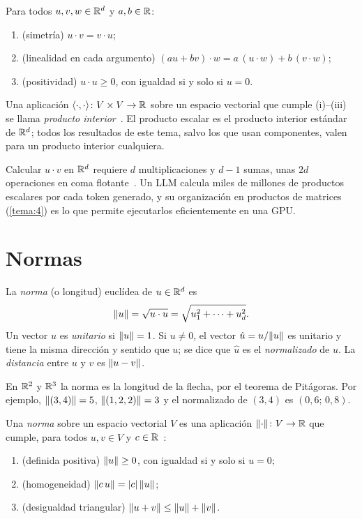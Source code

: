 \begin{proposicion}\label{prop:escalar}
Para todos $u,v,w\in\mathbb{R}^{d}$ y $a,b\in\mathbb{R}$:
\begin{enumerate}
  \item (simetría) $u\cdot v=v\cdot u$;
  \item (linealidad en cada argumento) $(au+bv)\cdot w=a\,(u\cdot w)+b\,(v\cdot w)$;
  \item (positividad) $u\cdot u\ge 0$, con igualdad si y solo si $u=0$.
\end{enumerate}
\end{proposicion}

Una aplicación $\langle \cdot,\cdot\rangle\colon V\times V\to\mathbb{R}$ sobre un espacio vectorial que cumple (i)--(iii) se llama \emph{producto interior}~\cite[§3.2]{mml}. El producto escalar es el producto interior estándar de $\mathbb{R}^{d}$; todos los resultados de este tema, salvo los que usan componentes, valen para un producto interior cualquiera.

\begin{observacion}[Coste]
Calcular $u\cdot v$ en $\mathbb{R}^{d}$ requiere $d$ multiplicaciones y $d-1$ sumas, unas $2d$ operaciones en coma flotante~\cite[§1.5]{vmls}. Un LLM calcula miles de millones de productos escalares por cada token generado, y su organización en productos de matrices (\cref{tema:4}) es lo que permite ejecutarlos eficientemente en una GPU.
\end{observacion}

\section{Normas}

\begin{definicion}\label{def:norma}
La \emph{norma} (o longitud) euclídea de $u\in\mathbb{R}^{d}$ es
\[
\lVert u\rVert=\sqrt{u\cdot u}=\sqrt{u_1^{2}+\dots+u_d^{2}}.
\]
Un vector $u$ es \emph{unitario} si $\lVert u\rVert=1$. Si $u\neq 0$, el vector $\hat u=u/\lVert u\rVert$ es unitario y tiene la misma dirección y sentido que $u$; se dice que $\hat u$ es el \emph{normalizado} de $u$. La \emph{distancia} entre $u$ y $v$ es $\lVert u-v\rVert$.
\end{definicion}

En $\mathbb{R}^{2}$ y $\mathbb{R}^{3}$ la norma es la longitud de la flecha, por el teorema de Pitágoras. Por ejemplo, $\lVert(3,4)\rVert=5$, $\lVert(1,2,2)\rVert=3$ y el normalizado de $(3,4)$ es $(0{,}6;\,0{,}8)$.

\begin{definicion}[Norma]\label{def:norma-general}
Una \emph{norma} sobre un espacio vectorial $V$ es una aplicación $\lVert\cdot\rVert\colon V\to\mathbb{R}$ que cumple, para todos $u,v\in V$ y $c\in\mathbb{R}$~\cite[§3.1]{mml}:
\begin{enumerate}
  \item (definida positiva) $\lVert u\rVert\ge 0$, con igualdad si y solo si $u=0$;
  \item (homogeneidad) $\lVert c\,u\rVert=\lvert c\rvert\,\lVert u\rVert$;
  \item (desigualdad triangular) $\lVert u+v\rVert\le\lVert u\rVert+\lVert v\rVert$.
\end{enumerate}
\end{definicion}

